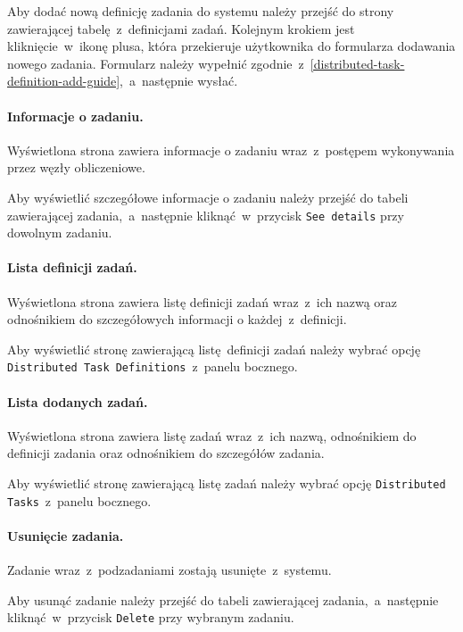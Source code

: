 \documentclass[a4paper,11pt,twoside]{report}
\theoremstyle{definition}
\begin{document}
                Aby dodać nową definicję zadania do systemu należy przejść do strony zawierającej tabelę~z~definicjami zadań. Kolejnym krokiem jest kliknięcie~w~ikonę plusa, która przekieruje użytkownika do formularza dodawania nowego zadania. Formularz należy wypełnić zgodnie~z~\ref{distributed-task-definition-add-guide},~a~następnie wysłać.

            \paragraph{Informacje o zadaniu.}    
                \noindent Wyświetlona strona zawiera informacje o zadaniu wraz~z~postępem wykonywania przez węzły obliczeniowe. 
                
                Aby wyświetlić szczegółowe informacje o zadaniu należy przejść do tabeli zawierającej zadania,~a~następnie kliknąć~w~przycisk \texttt{See details} przy dowolnym zadaniu.
                
            \paragraph{Lista definicji zadań.}  
                \noindent Wyświetlona strona zawiera listę definicji zadań wraz~z~ich nazwą oraz odnośnikiem do szczegółowych informacji o każdej~z~definicji.

                Aby wyświetlić stronę zawierającą listę definicji zadań należy wybrać opcję \texttt{Distributed Task Definitions}~z~panelu bocznego.

            \paragraph{Lista dodanych zadań.}   
                \noindent Wyświetlona strona zawiera listę zadań wraz~z~ich nazwą, odnośnikiem do definicji zadania oraz odnośnikiem do szczegółów zadania.
                
                Aby wyświetlić stronę zawierającą listę zadań należy wybrać opcję \texttt{Distributed Tasks}~z~panelu bocznego.

            \paragraph{Usunięcie zadania.}  
                \noindent Zadanie wraz~z~podzadaniami zostają usunięte~z~systemu.
                
                Aby usunąć zadanie należy przejść do tabeli zawierającej zadania,~a~następnie kliknąć~w~przycisk \texttt{Delete} przy wybranym zadaniu.
\end{document}
